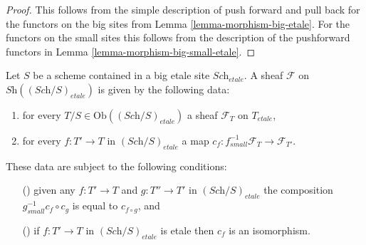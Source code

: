 \begin{proof}
This follows from the simple description of push forward
and pull back for the functors on the big sites from
Lemma \ref{lemma-morphism-big-etale}. For the functors
on the small sites this follows from the description of
the pushforward functors in Lemma \ref{lemma-morphism-big-small-etale}.
\end{proof}

\begin{lemma}
\label{lemma-characterize-sheaf-big-etale}
Let $S$ be a scheme contained in a big etale site $\textit{Sch}_{etale}$.
A sheaf $\mathcal{F}$ on $\textit{Sh}((\textit{Sch}/S)_{etale})$
is given by the following data:
\begin{enumerate}
\item for every $T/S \in \text{Ob}((\textit{Sch}/S)_{etale})$ a sheaf
$\mathcal{F}_T$ on $T_{etale}$,
\item for every $f : T' \to T$ in
$(\textit{Sch}/S)_{etale}$ a map
$c_f : f_{small}^{-1}\mathcal{F}_{T} \to \mathcal{F}_{T'}$.
\end{enumerate}
These data are subject to the following conditions:
\begin{enumerate}
\item[(\romannumeral1)] given any $f : T' \to T$ and $g : T'' \to T'$ in
$(\textit{Sch}/S)_{etale}$ the composition $g_{small}^{-1}c_f \circ c_g$
is equal to $c_{f \circ g}$, and
\item[(\romannumeral2)] if $f : T' \to T$ in $(\textit{Sch}/S)_{etale}$ is
etale then $c_f$ is an isomorphism.
\end{enumerate}
\end{lemma}

